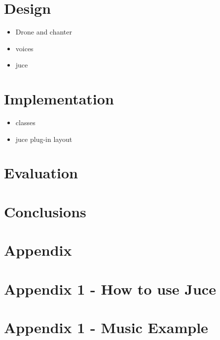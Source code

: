 \documentclass{article}
\begin{document}
	\section{Design}
	
	\begin{itemize}
		\item Drone and chanter
		\item voices
		\item juce
	\end{itemize}
	
	\section{Implementation}
	
	\begin{itemize}
		\item classes
		\item juce plug-in layout
	\end{itemize}
	
	\section{Evaluation}
	
	\section{Conclusions}
	
	\section{Appendix}
	\section{Appendix 1 - How to use Juce}
	\section{Appendix 1 - Music Example}
	
\end{document}
